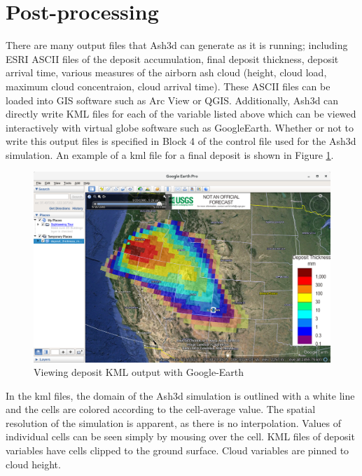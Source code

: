 \section{Post-processing}\label{ChapUsageSecPostProc}
There are many output files that Ash3d can generate as it is running; including
ESRI ASCII files of the deposit accumulation, final deposit thickness, deposit
arrival time, various
measures of the airborn ash cloud (height, cloud load, maximum cloud concentraion,
cloud arrival time).  These ASCII files can be loaded into GIS software such
as Arc View or QGIS. Additionally, Ash3d can directly write KML files for each of
the variable listed above which can be viewed interactively with virtual globe
software such as GoogleEarth. Whether or not to write this output files is specified
in Block 4 of the control file used for the Ash3d simulation. An example of a kml
file for a final deposit is shown in Figure \ref{FigAsh3dOutputKMLDep}.

\begin{figure}[htbp]
\includegraphics[angle=0,scale=0.35]{Figures/Ash3dOutput_KMLDep_GoogleEarth.png}
\parbox{15cm}{\caption{\label{FigAsh3dOutputKMLDep}
Viewing deposit KML output with Google-Earth}}
\end{figure}

In the kml files, the domain of the Ash3d simulation is outlined with a white line
and the cells are colored according to the cell-average value. The spatial resolution of
the simulation is apparent, as there is no interpolation. Values of individual cells
can be seen simply by mousing over the cell. KML files of deposit variables have cells
clipped to the ground surface.  Cloud variables are pinned to cloud height.

